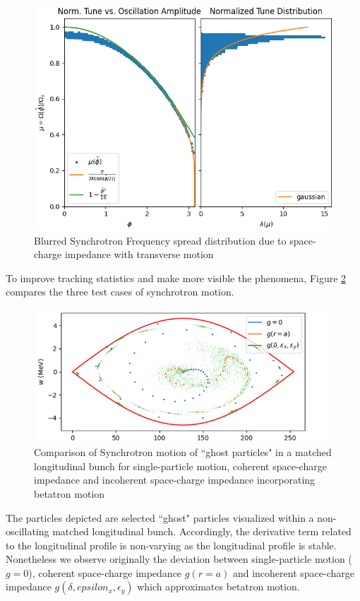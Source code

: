 \begin{figure}
    \centering
    \includegraphics{figs/tune_blurr/blurred_tune.png}
    \caption{Blurred Synchrotron Frequency spread distribution due to space-charge impedance with transverse motion}
    \label{fig:tune_blurr}
\end{figure}

To improve tracking statistics and make more visible the phenomena, Figure \ref{fig:full_comparison} compares the three test cases of synchrotron motion.

\begin{figure}
    \centering
    \includegraphics[width=\linewidth]{figs/tune_blurr/trajectories.png}
    \caption{Comparison of Synchrotron motion of ``ghost particles" in a matched longitudinal bunch for single-particle motion, coherent space-charge impedance and incoherent space-charge impedance incorporating betatron motion}
    \label{fig:full_comparison}
\end{figure}

The particles depicted are selected ``ghost" particles visualized within a non-oscillating matched longitudinal bunch. Accordingly, the derivative term related to the longitudinal profile is non-varying as the longitudinal profile is stable. Nonetheless we observe originally the deviation between single-particle motion ($g=0$), coherent space-charge impedance $g(r=a)$ and incoherent space-charge impedance $g(\delta, epsilon_x, \epsilon_y)$ which approximates betatron motion.

